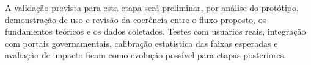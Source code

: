 A validação prevista para esta etapa será preliminar, por análise do protótipo,
demonstração de uso e revisão da coerência entre o fluxo proposto, os fundamentos
teóricos e os dados coletados. Testes com usuários reais, integração com portais
governamentais, calibração estatística das faixas esperadas e avaliação de
impacto ficam como evolução possível para etapas posteriores.

